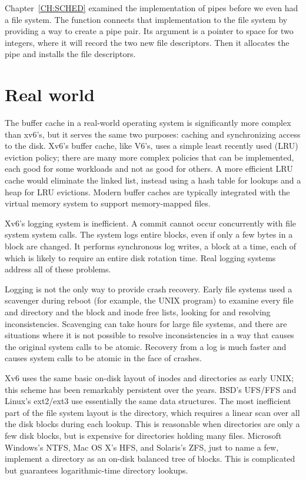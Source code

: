 Chapter~\ref{CH:SCHED} examined the implementation of pipes
before we even had a file system.
The function
connects that implementation to the file system
by providing a way to create a pipe pair.
Its argument is a pointer to space for two integers,
where it will record the two new file descriptors.
Then it allocates the pipe and installs the file descriptors.
\section{Real world}

The buffer cache in a real-world operating system is significantly
more complex than xv6's, but it serves the same two purposes:
caching and synchronizing access to the disk.
Xv6's buffer cache, like V6's, uses a simple least recently used (LRU)
eviction policy; there are many more complex
policies that can be implemented, each good for some
workloads and not as good for others.
A more efficient LRU cache would eliminate the linked list,
instead using a hash table for lookups and a heap for LRU evictions.
Modern buffer caches are typically integrated with the
virtual memory system to support memory-mapped files.

Xv6's logging system is inefficient.
A commit cannot occur concurrently with file system system calls.
The system logs entire blocks, even if
only a few bytes in a block are changed. It performs synchronous
log writes, a block at a time, each of which is likely to require an
entire disk rotation time. Real logging systems address all of these
problems.

Logging is not the only way to provide crash recovery. Early file systems
used a scavenger during reboot (for example, the UNIX
program) to examine every file and directory and the block and inode
free lists, looking for and resolving inconsistencies. Scavenging can take
hours for large file systems, and there are situations where it is not
possible to resolve inconsistencies in a way that causes the original
system calls to be atomic. Recovery
from a log is much faster and causes system calls to be atomic
in the face of crashes.

Xv6 uses the same basic on-disk layout of inodes and directories
as early UNIX;
this scheme has been remarkably persistent over the years.
BSD's UFS/FFS and Linux's ext2/ext3 use essentially the same data structures.
The most inefficient part of the file system layout is the directory,
which requires a linear scan over all the disk blocks during each lookup.
This is reasonable when directories are only a few disk blocks,
but is expensive for directories holding many files.
Microsoft Windows's NTFS, Mac OS X's HFS, and Solaris's ZFS, just to name a few, implement
a directory as an on-disk balanced tree of blocks.
This is complicated but guarantees logarithmic-time directory lookups.


